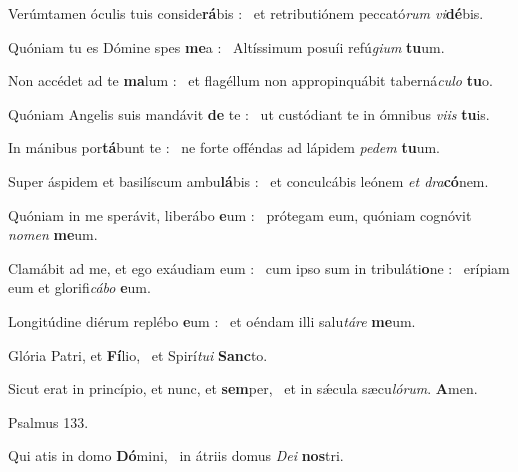 \documentclass[12pt]{article} %
\def\noinitial{%
\gresetfirstlineaboveinitial{\textcolor{benred8}{\small \textsc{\textbf{}}}}{\textcolor{benred8}{\small \textsc{\textbf{}}}}
\setspaceafterinitial{0pt plus 0em minus 0em}%
\setspacebeforeinitial{0pt plus 0em minus 0em}%
\relax %
}
\newenvironment{psalmtext}{\leftskip 0.25in}{\vspace{1 mm}}
\let\oldgresixstar\gresixstar
\renewcommand{\gresixstar}{\textcolor{benred8}{\oldgresixstar}}
\let\oldgredagger\gredagger
\renewcommand{\gredagger}{\textcolor{benred8}{\oldgredagger}}
\begin{document}
\begin{pages}
\begin{Leftside}
\begin{psalmtext}
Ver\'{u}mtamen \'{o}culis tuis conside\textbf{r\'{a}}bis : \gresixstar\ et retributi\'{o}nem peccat\'{o}\emph{rum vi}\textbf{d\'{e}}bis.

Qu\'{o}niam tu es D\'{o}mine spes \textbf{me}a : \gresixstar\ Alt\'{i}ssimum posu\'{i}i ref\'{u}\emph{gium} \textbf{tu}um.

Non acc\'{e}det ad te \textbf{ma}lum : \gresixstar\ et flag\'{e}llum non appropinqu\'{a}bit tabern\'{a}\emph{culo} \textbf{tu}o.

Qu\'{o}niam Angelis suis mand\'{a}vit \textbf{de} te : \gresixstar\ ut cust\'{o}diant te in \'{o}mnibus \emph{viis} \textbf{tu}is.

In m\'{a}nibus por\textbf{t\'{a}}bunt te : \gresixstar\ ne forte off\'{e}ndas ad l\'{a}pidem \emph{pedem} \textbf{tu}um.

Super \'{a}spidem et basil\'{i}scum ambu\textbf{l\'{a}}bis : \gresixstar\ et conculc\'{a}bis le\'{o}nem \emph{et dra}\textbf{c\'{o}}nem.

Qu\'{o}niam in me sper\'{a}vit, liber\'{a}bo \textbf{e}um : \gresixstar\ pr\'{o}tegam eum, qu\'{o}niam cogn\'{o}vit \emph{nomen} \textbf{me}um.

Clam\'{a}bit ad me, et ego ex\'{a}udiam eum : \gredagger\ cum ipso sum in tribul\'{a}ti\textbf{o}ne : \gresixstar\ er\'{i}piam eum et glorifi\emph{c\'{a}bo} \textbf{e}um.

Longit\'{u}dine di\'{e}rum repl\'{e}bo \textbf{e}um : \gresixstar\ et o\'{e}ndam illi salu\emph{t\'{a}re} \textbf{me}um.

Gl\'{o}ria Patri, et \textbf{F\'{i}}lio, \gresixstar\ et Spir\'{i}\emph{tui} \textbf{Sanc}to.

Sicut erat in princ\'{i}pio, et nunc, et \textbf{sem}per, \gresixstar\ et in s\'{\ae}cula s\ae cu\emph{l\'{o}rum}. \textbf{A}men.

\end{psalmtext}

\pend\pstart


{
\centering
\textcolor{benred8}{Psalmus 133.}

}

\pend\pstart

{\noinitial
{}

}

\pend\pstart

\begin{psalmtext}
Qui atis in domo \textbf{D\'{o}}mini, \gresixstar\ in \'{a}triis domus \emph{Dei} \textbf{nos}tri.


\end{psalmtext}
\end{Leftside}
\end{pages}
\end{document}

